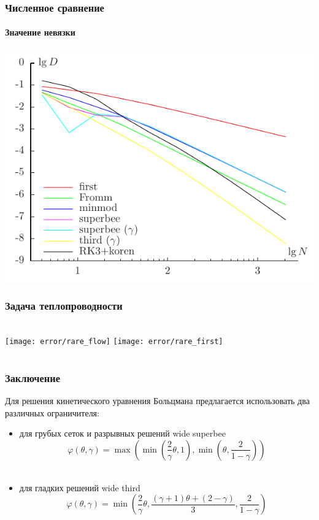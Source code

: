\documentclass[ucs]{beamer}
\begin{document}
\begin{frame}
	\frametitle{Численное сравнение}
	\framesubtitle{Значение невязки}
	\begin{center}
		\includegraphics[width=.8\textwidth]{residual/09_3dis}
	\end{center}
\end{frame}

\begin{frame}
	\frametitle{Задача теплопроводности}
	 \\
	\texttt{[image: error/rare\_flow]}
	\texttt{[image: error/rare\_first]}
\end{frame}

\section*{}
\begin{frame}
	\frametitle{Заключение}
	Для решения кинетического уравнения Больцмана предлагается использовать два различных ограничителя:
	\begin{itemize}
		\item для \alert{грубых} сеток и \alert{разрывных} решений \alert{wide superbee}
			\[ \varphi(\theta,\gamma) = \max\left(\min\left(\dfrac2{\gamma}\theta,1\right),\min\left(\theta,\dfrac2{1-\gamma}\right)\right) \] \\
		\item для \alert{гладких} решений \alert{wide third} 
			\[ \varphi(\theta,\gamma) = \min\left(\dfrac2{\gamma}\theta,\dfrac{(\gamma+1)\theta+(2-\gamma)}{3},\dfrac2{1-\gamma}\right) \] \\
	\end{itemize}

\end{frame}
\end{document}
